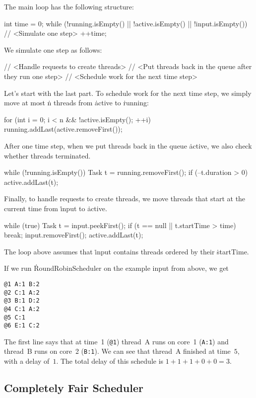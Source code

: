 The main loop has the following structure:
\begin{ccode}
int time = 0;
while (!running.isEmpty() || !active.isEmpty() || !input.isEmpty()) {
  // <Simulate one step>
  ++time;
}
\end{ccode}
We simulate one step as follows:
\begin{ccode}
// <Handle requests to create threads>
// <Put threads back in the queue after they run one step>
// <Schedule work for the next time step>
\end{ccode}
Let's start with the last part.
To schedule work for the next time step,
  we simply move at most \.{n} threads from \.{active} to \.{running}:
\begin{ccode}
for (int i = 0; i < n && !active.isEmpty(); ++i)
  running.addLast(active.removeFirst());
\end{ccode}
After one time step, when we put threads back in the queue \.{active},
  we also check whether threads terminated.
\begin{ccode}
while (!running.isEmpty()) {
  Task t = running.removeFirst();
  if (--t.duration > 0) active.addLast(t);
}
\end{ccode}
Finally, to handle requests to create threads,
  we move threads that start at the current time from \.{input} to \.{active}.
\begin{ccode}
while (true) {
  Task t = input.peekFirst();
  if (t == null || t.startTime > time) break;
  input.removeFirst();
  active.addLast(t);
}
\end{ccode}
The loop above assumes that \.{input} contains threads ordered by their \.{startTime}.

If we run \.{RoundRobinScheduler} on the example input from above, we get
\begin{verbatim}
@1 A:1 B:2
@2 C:1 A:2
@3 B:1 D:2
@4 C:1 A:2
@5 C:1
@6 E:1 C:2
\end{verbatim}
The first line says that at time~1 ({\tt @1})
  thread~A runs on core~1 ({\tt A:1}) and
  thread~B runs on core~2 ({\tt B:1}).
We can see that thread~A finished at time~$5$, with a delay of~$1$.
The total delay of this schedule is $1+1+1+0+0=3$.

\subsection{Completely Fair Scheduler}

